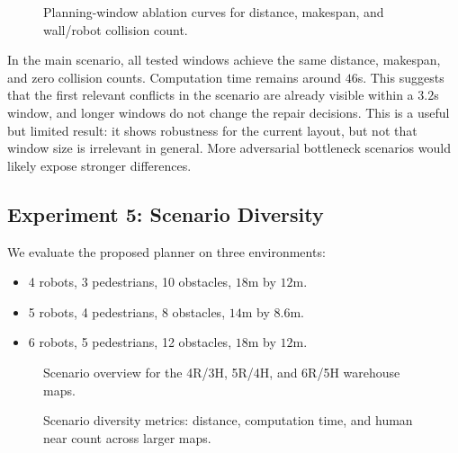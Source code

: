 \documentclass[10pt,twocolumn,letterpaper]{article}
\begin{document}
\begin{table}[t]
    \centering
    \caption{Planning-window ablation. Insert \texttt{results/0615\_results/planning\_window\_ablation.csv}.}
    \label{tab:window_ablation}
\end{table}

\begin{figure}[t]
    \centering
    \caption{Planning-window ablation curves for distance, makespan, and wall/robot collision count.}
    \label{fig:window_ablation}
\end{figure}

In the main scenario, all tested windows achieve the same distance, makespan, and zero collision counts. Computation time remains around $46$s. This suggests that the first relevant conflicts in the scenario are already visible within a $3.2$s window, and longer windows do not change the repair decisions. This is a useful but limited result: it shows robustness for the current layout, but not that window size is irrelevant in general. More adversarial bottleneck scenarios would likely expose stronger differences.

\subsection{Experiment 5: Scenario Diversity}
We evaluate the proposed planner on three environments:
\begin{itemize}
    \item 4 robots, 3 pedestrians, 10 obstacles, $18$m by $12$m.
    \item 5 robots, 4 pedestrians, 8 obstacles, $14$m by $8.6$m.
    \item 6 robots, 5 pedestrians, 12 obstacles, $18$m by $12$m.
\end{itemize}

\begin{table}[t]
    \centering
    \caption{Scenario diversity results. Insert \texttt{results/0615\_results/scenario\_diversity\_metrics.csv}.}
    \label{tab:scenario_diversity}
\end{table}

\begin{figure}[t]
    \centering
    \caption{Scenario overview for the 4R/3H, 5R/4H, and 6R/5H warehouse maps.}
    \label{fig:scenario_overview}
\end{figure}

\begin{figure}[t]
    \centering
    \caption{Scenario diversity metrics: distance, computation time, and human near count across larger maps.}
    \label{fig:scenario_diversity}
\end{figure}
\end{document}
